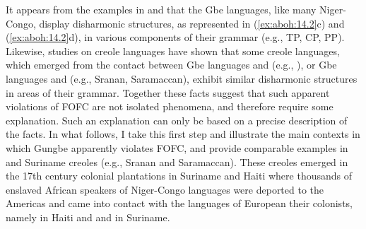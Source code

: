 \documentclass[output=paper]{langsci/langscibook}
\begin{document}
\ea\label{ex:aboh:14.5}
    {\setlength\multicolsep{0pt}
    \begin{multicols}{2}
    \ea\label{ex:aboh:14.5a}
    \ex\label{ex:aboh:14.5b}
    \z
    \end{multicols}}
\z

It appears from the examples in  and  that
the Gbe languages, like many Niger-Congo, display disharmonic structures, as
represented in (\ref{ex:aboh:14.2}c) and (\ref{ex:aboh:14.2}d), in various components of their grammar (e.g., TP,
CP, PP). Likewise, studies on creole languages have shown that some creole
languages, which emerged from the contact between Gbe languages and 
(e.g., ), or Gbe languages and  (e.g., Sranan,
Saramaccan), exhibit similar disharmonic structures in areas of their grammar.
Together these facts suggest that such apparent violations of \gls{FOFC} are
not isolated phenomena, and therefore require some explanation. Such an
explanation can only be based on a precise description of the facts. In what
follows, I take this first step and illustrate the main contexts in which
Gungbe apparently violates FOFC, and provide comparable examples in
 and Suriname creoles (e.g., Sranan and Saramaccan). These
creoles emerged in the 17th century colonial plantations in Suriname and Haiti
where thousands of enslaved African speakers of Niger-Congo languages were
deported to the Americas and came into contact with the languages of European
their colonists, namely  in Haiti and  and  in Suriname.
\end{document}
